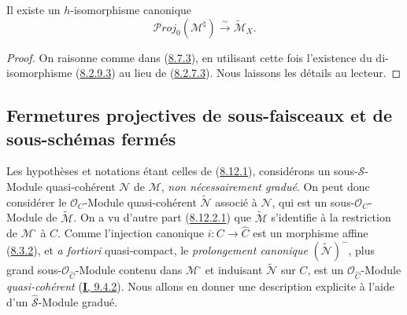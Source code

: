 \begin{proposition}[8.12.10]
\label{II.8.12.10-fr}
Il existe un $h$-isomorphisme canonique
\begin{equation}
\label{II.8.12.10.1-fr}
  \mathcal{P}\mathit{roj}_0(\mathcal{M}^{\natural})
  \xrightarrow{\sim}\widetilde{\mathcal{M}}_X.
\tag{8.12.10.1}
\end{equation}
\end{proposition}

\begin{proof}
On raisonne comme dans (\hyperref[II.8.7.3-fr]{8.7.3}), en utilisant cette
fois l'existence du di-isomorphisme (\hyperref[II.8.2.9.3-fr]{8.2.9.3}) au
lieu de (\hyperref[II.8.2.7.3-fr]{8.2.7.3}). Nous laissons les détails au
lecteur.
\end{proof}

\subsection{Fermetures projectives de sous-faisceaux et de sous-schémas
fermés}
\label{subsection:II.8.13-fr}

\begin{env}[8.13.1]
\label{II.8.13.1-fr}
Les hypothèses et notations étant celles de
(\hyperref[II.8.12.1-fr]{8.12.1}), considérons un sous-$\mathcal{S}$-Module
quasi-cohérent $\mathcal{N}$ de $\mathcal{M}$, \emph{non nécessairement
gradué}. On peut donc considérer le $\mathcal{O}_C$-Module quasi-cohérent
$\widetilde{\mathcal{N}}$ associé à $\mathcal{N}$, qui est un
sous-$\mathcal{O}_C$-Module de $\widetilde{\mathcal{M}}$. On a vu d'autre
part (\hyperref[II.8.12.2.1-fr]{8.12.2.1}) que
$\widetilde{\mathcal{M}}$ s'identifie à la restriction de
$\mathcal{M}^{\square}$ à $C$. Comme l'injection canonique
$i:C\to\widehat{C}$ est un morphisme affine
(\hyperref[II.8.3.2-fr]{8.3.2}), et \emph{a fortiori} quasi-compact, le
\emph{prolongement canonique} $(\widetilde{\mathcal{N}})^{-}$, plus grand
sous-$\mathcal{O}_{\widehat{C}}$-Module contenu dans
$\mathcal{M}^{\square}$ et induisant $\widetilde{\mathcal{N}}$ sur $C$, est
un $\mathcal{O}_{\widehat{C}}$-Module \emph{quasi-cohérent}
(\hyperref[I.9.4.2-fr]{\textbf{I}, 9.4.2}). Nous allons en donner une description
explicite à l'aide d'un $\widehat{\mathcal{S}}$-Module gradué.
\end{env}

